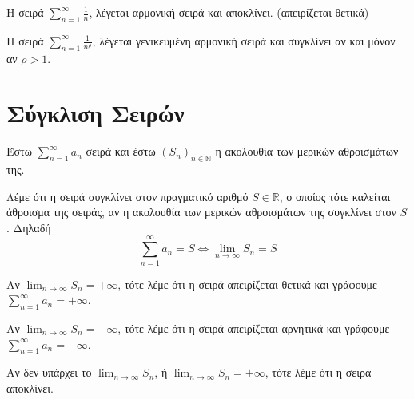 \documentclass[a4paper,table]{report}
\begin{document}
\begin{rems}
\item {}
    \begin{myitemize}
    \item Η σειρά $ \sum_{n=1}^{\infty} \frac{1}{n}  $, λέγεται 
        \textcolor{Col2}{αρμονική σειρά} και αποκλίνει. (απειρίζεται θετικά)
    \item Η σειρά $ \sum_{n=1}^{\infty} \frac{1}{n^{\rho}}  $, λέγεται 
        \textcolor{Col2}{γενικευμένη αρμονική σειρά} και συγκλίνει αν και μόνον αν 
        $ \rho > 1 $.
    \end{myitemize}
\end{rems}

\section{Σύγκλιση Σειρών}

\begin{mybox1}
\begin{dfn}
Έστω $ \sum_{n=1}^{\infty} a_{n}  $ σειρά και έστω $ {(S_{n})}_{n \in \mathbb{N}} $ 
η ακολουθία των μερικών αθροισμάτων της. 

Λέμε ότι η σειρά \textcolor{Col2}{συγκλίνει} στον πραγματικό αριθμό 
$ S \in \mathbb{R} $, ο οποίος 
τότε καλείται \textcolor{Col2}{άθροισμα} της σειράς, αν η ακολουθία των 
μερικών αθροισμάτων της συγκλίνει στον $ S $. Δηλαδή
\[
    \sum_{n=1}^{\infty} a_{n} = S \Leftrightarrow \lim_{n \to \infty} S_{n} = S  
\] 
\end{dfn}
\end{mybox1}

\begin{rem}
\item {}
  \begin{myitemize}
    \item Αν $ \lim_{n \to \infty} S_{n} = + \infty $, τότε λέμε ότι η σειρά
      \textcolor{Col1}{απειρίζεται
      θετικά} και γράφουμε $ \sum_{n=1}^{\infty} a_{n} = + \infty $.
    \item Αν $ \lim_{n \to \infty} S_{n} = - \infty $, τότε λέμε ότι η σειρά
      \textcolor{Col1}{απειρίζεται
      αρνητικά} και γράφουμε $ \sum_{n=1}^{\infty} a_{n} = - \infty $.
    \item Αν δεν υπάρχει το $ \lim_{n \to \infty} S_{n} $, ή $ \lim_{n \to \infty} S_{n}=
      \pm \infty$, τότε λέμε ότι η σειρά \textcolor{Col1}{αποκλίνει}.

  \end{myitemize}
\end{rem}
\end{document}
